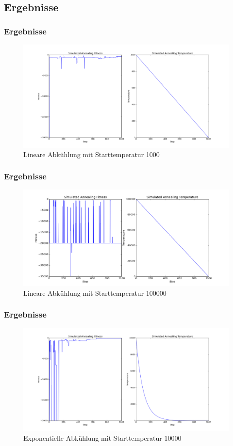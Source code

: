 \subsection{Ergebnisse}

\begin{frame}
\frametitle{Ergebnisse}
    \begin{figure}
        \includegraphics[width=\textwidth]{sa-gs/lin_ok.png}
        \caption{Lineare Abkühlung mit Starttemperatur 1000}
    \end{figure}
\end{frame}


\begin{frame}
\frametitle{Ergebnisse}
    \begin{figure}
        \includegraphics[width=\textwidth]{sa-gs/lin_doof.png}
        \caption{Lineare Abkühlung mit Starttemperatur 100000}
    \end{figure}
\end{frame}

\begin{frame}
\frametitle{Ergebnisse}
    \begin{figure}
        \includegraphics[width=\textwidth]{sa-gs/exp_gut.png}
        \caption{Exponentielle Abkühlung mit Starttemperatur 10000}
    \end{figure}
\end{frame}

